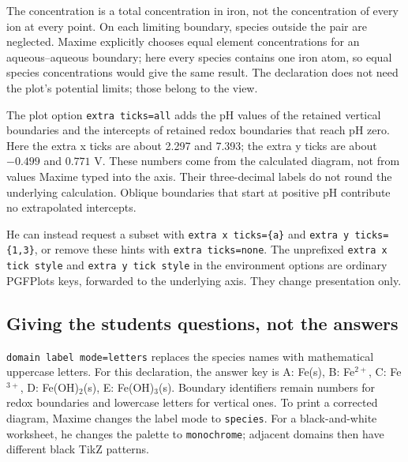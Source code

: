 \documentclass[a4paper,11pt]{ltxdoc}
\begin{document}
The concentration is a total concentration in iron, not the concentration of
every ion at every point. On each limiting boundary, species outside the pair
are neglected. Maxime explicitly chooses equal element concentrations for an
aqueous--aqueous boundary; here every species contains one iron atom, so equal
species concentrations would give the same result. The declaration does not
need the plot's potential limits; those belong to the view.

The plot option \texttt{extra ticks=all} adds the pH values of the retained
vertical boundaries and the intercepts of retained redox boundaries that reach
pH zero. Here the extra x ticks are about 2.297 and 7.393; the extra y ticks are
about $-0.499$ and $0.771$ V. These numbers come from the calculated diagram,
not from values Maxime typed into the axis. Their three-decimal labels do not
round the underlying calculation. Oblique boundaries that start at positive
pH contribute no extrapolated intercepts.

He can instead request a subset with \texttt{extra x ticks=\{a\}} and
\texttt{extra y ticks=\{1,3\}}, or remove these hints with
\texttt{extra ticks=none}. The unprefixed \texttt{extra x tick style} and
\texttt{extra y tick style} in the environment options are ordinary PGFPlots
keys, forwarded to the underlying axis. They change presentation only.

\subsection{Giving the students questions, not the answers}
\texttt{domain label mode=letters} replaces the species names with mathematical
uppercase letters. For this declaration, the answer key is A: Fe(s), B:
Fe$^{2+}$, C: Fe$^{3+}$, D: Fe(OH)$_2$(s), E: Fe(OH)$_3$(s). Boundary identifiers
remain numbers for redox boundaries and lowercase letters for vertical ones.
To print a corrected diagram, Maxime changes the label mode to \texttt{species}.
For a black-and-white worksheet, he changes the palette to \texttt{monochrome};
adjacent domains then have different black TikZ patterns.
\end{document}
